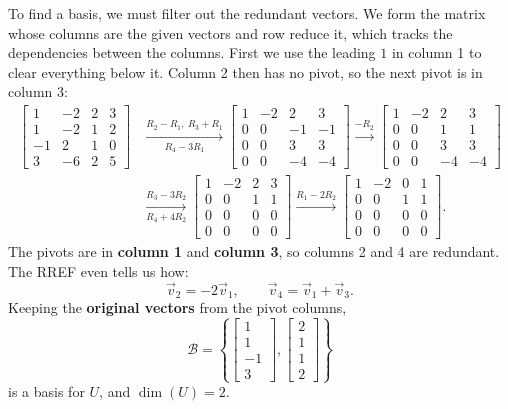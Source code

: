 \begin{example}
\begin{solution}
To find a basis, we must filter out the redundant vectors. We form the matrix whose columns are the given vectors and row reduce it, which tracks the dependencies between the columns. First we use the leading $1$ in column 1 to clear everything below it. Column 2 then has no pivot, so the next pivot is in column 3:
\begin{align*}
\begin{bmatrix}
 1 & -2 & 2 & 3 \\
 1 & -2 & 1 & 2 \\
-1 &  2 & 1 & 0 \\
 3 & -6 & 2 & 5
\end{bmatrix}
&\xrightarrow[R_4 - 3R_1]{R_2 - R_1,\ R_3 + R_1}
\begin{bmatrix}
1 & -2 &  2 &  3 \\
0 &  0 & -1 & -1 \\
0 &  0 &  3 &  3 \\
0 &  0 & -4 & -4
\end{bmatrix}
\xrightarrow{-R_2}
\begin{bmatrix}
1 & -2 &  2 &  3 \\
0 &  0 &  1 &  1 \\
0 &  0 &  3 &  3 \\
0 &  0 & -4 & -4
\end{bmatrix} \\[0.8em]
&\xrightarrow[R_4 + 4R_2]{R_3 - 3R_2}
\begin{bmatrix}
1 & -2 & 2 & 3 \\
0 &  0 & 1 & 1 \\
0 &  0 & 0 & 0 \\
0 &  0 & 0 & 0
\end{bmatrix}
\xrightarrow{R_1 - 2R_2}
\begin{bmatrix}
1 & -2 & 0 & 1 \\
0 &  0 & 1 & 1 \\
0 &  0 & 0 & 0 \\
0 &  0 & 0 & 0
\end{bmatrix}.
\end{align*}
The pivots are in \textbf{column 1} and \textbf{column 3}, so columns 2 and 4 are redundant. The RREF even tells us how:
\[
\vec{v}_2 = -2\vec{v}_1, \qquad \vec{v}_4 = \vec{v}_1 + \vec{v}_3.
\]
Keeping the \textbf{original vectors} from the pivot columns,
\[
\mathcal{B} = \left\{
\begin{bmatrix} 1 \\ 1 \\ -1 \\ 3 \end{bmatrix},
\begin{bmatrix} 2 \\ 1 \\ 1 \\ 2 \end{bmatrix}
\right\}
\]
is a basis for $U$, and $\dim(U) = 2$.
\end{solution}
\end{example}


